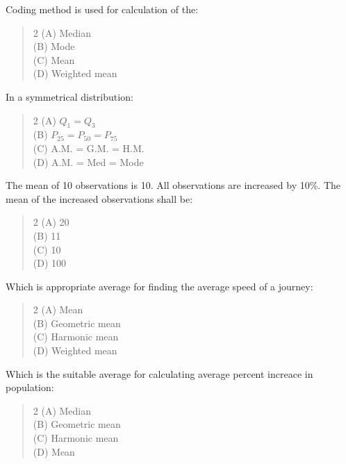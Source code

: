 \documentclass[11pt,a4paper]{article}
\begin{document}
\begin{mcqlist}
\item Coding method is used for calculation of the:
\begin{quote}\begin{multicols}{2}
\noindent (A) Median \\
(B) Mode \\
(C) Mean \\
(D) Weighted mean
\end{multicols}\end{quote}

\item In a symmetrical distribution:
\begin{quote}\begin{multicols}{2}
\noindent (A) $Q_1=Q_3$ \\
(B) $P_{25}=P_{50}=P_{75}$ \\
(C) A.M. = G.M. = H.M. \\
(D) A.M. = Med = Mode
\end{multicols}\end{quote}

\item The mean of 10 observations is 10. All observations are increased by 10\%. The mean of the increased observations shall be:
\begin{quote}\begin{multicols}{2}
\noindent (A) 20 \\
(B) 11 \\
(C) 10 \\
(D) 100
\end{multicols}\end{quote}

\item Which is appropriate average for finding the average speed of a journey:
\begin{quote}\begin{multicols}{2}
\noindent (A) Mean \\
(B) Geometric mean \\
(C) Harmonic mean \\
(D) Weighted mean
\end{multicols}\end{quote}

\item Which is the suitable average for calculating average percent increace in population:
\begin{quote}\begin{multicols}{2}
\noindent (A) Median \\
(B) Geometric mean \\
(C) Harmonic mean \\
(D) Mean
\end{multicols}\end{quote}


\end{mcqlist}
\end{document}
